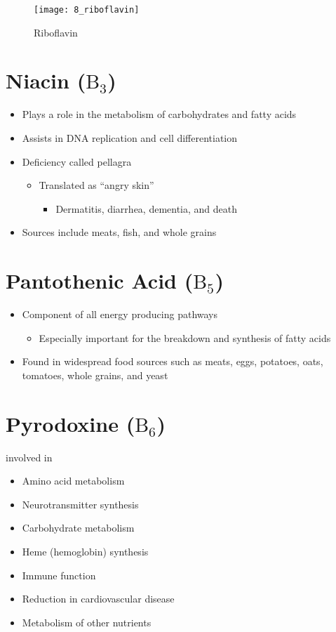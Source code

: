 \documentclass[title={Chapter 8}]{fdsn201notes}
\begin{document}
\begin{figure}[H]
	\centering
	\texttt{[image: 8\_riboflavin]}
	\caption{Riboflavin}
	\label{fig:riboflavin}
\end{figure}

\section{Niacin ($\mbox{B}_{3}$)}\label{sec:niacin}
\begin{itemize}
	\item Plays a role in the metabolism of carbohydrates and fatty acids
	\item Assists in DNA replication and cell differentiation
	\item Deficiency called pellagra
	\begin{itemize}
		\item Translated as ``angry skin''
		\begin{itemize}
			\item Dermatitis, diarrhea, dementia, and death
		\end{itemize}
	\end{itemize}
	\item Sources include meats, fish, and whole grains
\end{itemize}

\section{Pantothenic Acid ($\mbox{B}_{5}$)}\label{sec:Pantothenic Acid}
\begin{itemize}
	\item Component of all energy producing pathways
	\begin{itemize}
		\item Especially important for the breakdown and synthesis of fatty acids
	\end{itemize}
	\item Found in widespread food sources such as meats, eggs, potatoes, oats, tomatoes, whole grains, and yeast
\end{itemize}

\section{Pyrodoxine ($\mbox{B}_{6}$)}\label{sec:pyrodoxine}
involved in
\begin{itemize}
	\item Amino acid metabolism
	\item Neurotransmitter synthesis
	\item Carbohydrate metabolism
	\item Heme (hemoglobin) synthesis
	\item Immune function
	\item Reduction in cardiovascular disease
	\item Metabolism of other nutrients
\end{itemize}
\end{document}
